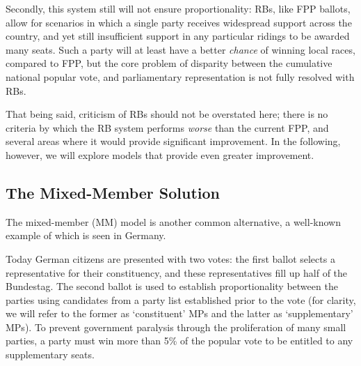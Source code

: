 Secondly, this system still will not ensure proportionality: RBs, like FPP ballots, allow for scenarios in which a single party receives widespread support across the country, and yet still insufficient support in any particular ridings to be awarded many seats.
Such a party will at least have a better \emph{chance} of winning local races, compared to FPP, but the core problem of disparity between the cumulative national popular vote, and parliamentary representation is not fully resolved with RBs.

That being said, criticism of RBs should not be overstated here; there is no criteria by which the RB system performs \emph{worse} than the current FPP, and several areas where it would provide significant improvement.
In the following, however, we will explore models that provide even greater improvement.


\subsection{The Mixed-Member Solution}
\label{sec:german_model}

The mixed-member (MM) model is another common alternative, a well-known example of which is seen in Germany.

Today German citizens are presented with two votes: the first ballot selects a representative for their constituency, and these representatives fill up half of the Bundestag.
The second ballot is used to establish proportionality between the parties using candidates from a party list established prior to the vote
(for clarity, we will refer to the former as `constituent' MPs  and the latter as `supplementary' MPs).
To prevent government paralysis through the proliferation of many small parties, a party must win more than 5\% of the popular vote to be entitled to any supplementary seats.

